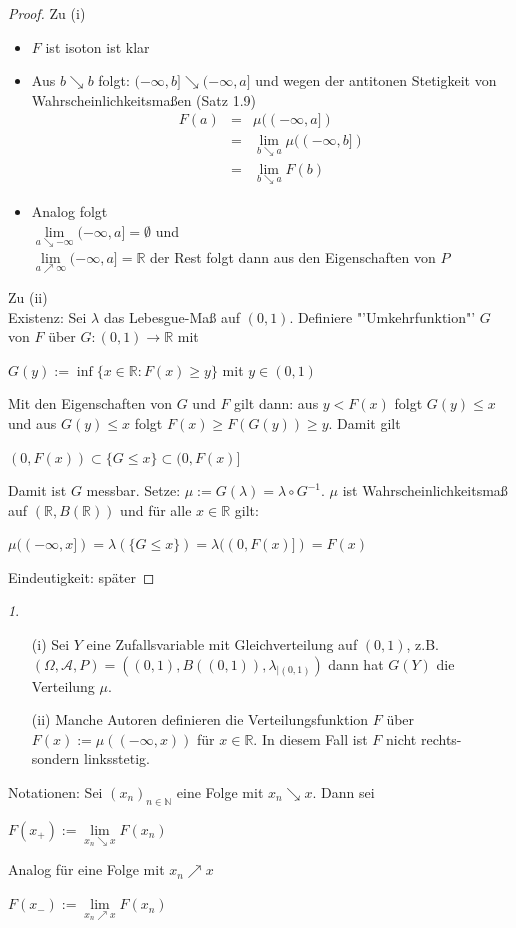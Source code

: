 \documentclass[10pt,a4paper]{report}
\newcommand{\N}{\mathbb{N}}
\newcommand{\R}{\mathbb{R}}
\numberwithin{equation}{section}
\numberwithin{figure}{section}
\theoremstyle{plain}
\theoremstyle{definition}
\theoremstyle{remark}
\newtheorem{rem}[thm]{\protect\remarkname}
\theoremstyle{plain}
\providecommand{\remarkname}{Bemerkung}
\newcommand{\1}{ \mathbb{1} } %
\begin{document}
\begin{proof}
  Zu (i)
  \begin{itemize}
  \item $F$ ist isoton ist klar
  \item Aus $b \searrow b$ folgt: $(-\infty,b] \searrow (-\infty,a]$
    und wegen der antitonen Stetigkeit von Wahrscheinlichkeitsmaßen (Satz 1.9)
    \begin{eqnarray*}
      F(a)&=&\mu((-\infty,a])\\
      &=& \lim\limits_{b\searrow a} \mu((-\infty,b]) \\
      &=& \lim\limits_{b\searrow a} F(b)
    \end{eqnarray*}
  \item Analog folgt\\
    $\lim\limits_{a\searrow -\infty} (-\infty,a]=\emptyset$ und\\
    $\lim\limits_{a\nearrow \infty} (-\infty,a]=\R$ der Rest folgt
    dann aus den Eigenschaften von $P$
  \end{itemize}
  Zu (ii)\\
  Existenz: Sei $\lambda$ das Lebesgue-Maß auf $(0,1)$. Definiere
  "'Umkehrfunktion"' $G$ von $F$ über $G:(0,1) \to \R$ mit
  \begin{center}
    $G(y):=\inf\{x \in \R:F(x)\geq y\}$ mit $y \in (0,1)$
  \end{center}
  Mit den Eigenschaften von $G$ und $F$ gilt dann: aus $y<F(x)$ folgt
  $G(y)\leq x$ und aus $G(y)\leq x$ folgt $F(x)\geq F(G(y))\geq
  y$. Damit gilt
  \begin{center}
    $(0,F(x)) \subset \{G\leq x\}\subset (0,F(x)]$
  \end{center}
  Damit ist $G$ messbar. Setze: $\mu:=G(\lambda)=\lambda\circ
  G^{-1}$. $\mu$ ist Wahrscheinlichkeitsmaß auf $(\R,B(\R))$ und für alle $x \in \R$
  gilt:
  \begin{center}
    $\mu((-\infty,x])=\lambda(\{G\leq x\})=\lambda((0,F(x)])=F(x)$
  \end{center}
  Eindeutigkeit: später
\end{proof}
\begin{rem}
  \begin{itemize}
  \item[(i)] Sei $Y$ eine Zufallsvariable mit Gleichverteilung auf $(0,1)$,
    z.B. $(\Omega,\mathcal{A},P)=((0,1),B((0,1)),\lambda_{|(0,1)})$
    dann hat $G(Y)$ die Verteilung $\mu$.
  \item[(ii)] Manche Autoren definieren die Verteilungsfunktion $F$
    über $F(x):=\mu((-\infty,x))$ für $x \in \R$. In diesem Fall ist
    $F$ nicht rechts- sondern linksstetig.
  \end{itemize}
  Notationen: Sei $(x_n)_{n \in \N}$ eine Folge mit $x_n\searrow
  x$. Dann sei
  \begin{center}
    $F(x_+):=\lim\limits_{x_n\searrow x} F(x_n)$
  \end{center}
  Analog für eine Folge mit $x_n\nearrow x$
  \begin{center}
    $F(x_-):=\lim\limits_{x_n\nearrow x} F(x_n)$
  \end{center}
\end{rem}
\end{document}
